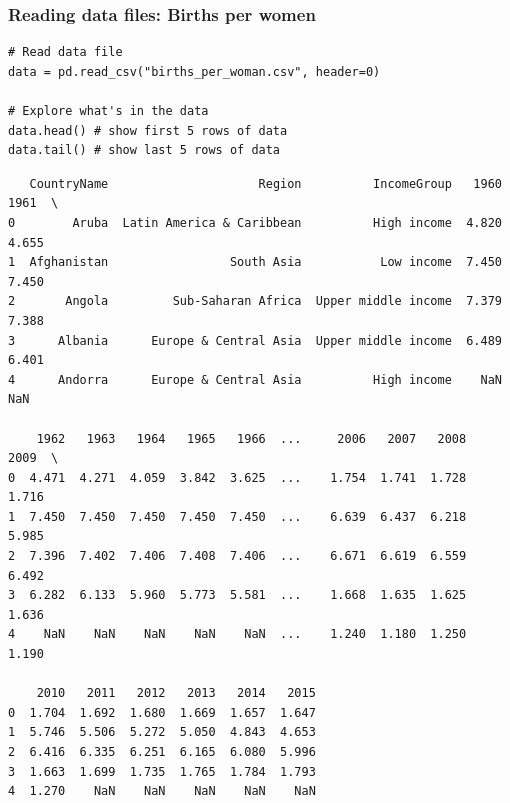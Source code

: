 \documentclass[xcolor=table]{beamer}
\begin{document}
\begin{frame}[fragile]
\frametitle{Reading data files: Births per women}

\begin{lstlisting}[style=python]
# Read data file
data = pd.read_csv("births_per_woman.csv", header=0)

# Explore what's in the data 
data.head() # show first 5 rows of data
data.tail() # show last 5 rows of data
\end{lstlisting}

\vspace{-0.8cm}
{\fontsize{5}{6}\selectfont
\begin{verbatim}
   CountryName                     Region          IncomeGroup   1960   1961  \
0        Aruba  Latin America & Caribbean          High income  4.820  4.655   
1  Afghanistan                 South Asia           Low income  7.450  7.450   
2       Angola         Sub-Saharan Africa  Upper middle income  7.379  7.388   
3      Albania      Europe & Central Asia  Upper middle income  6.489  6.401   
4      Andorra      Europe & Central Asia          High income    NaN    NaN   

    1962   1963   1964   1965   1966  ...     2006   2007   2008   2009  \
0  4.471  4.271  4.059  3.842  3.625  ...    1.754  1.741  1.728  1.716   
1  7.450  7.450  7.450  7.450  7.450  ...    6.639  6.437  6.218  5.985   
2  7.396  7.402  7.406  7.408  7.406  ...    6.671  6.619  6.559  6.492   
3  6.282  6.133  5.960  5.773  5.581  ...    1.668  1.635  1.625  1.636   
4    NaN    NaN    NaN    NaN    NaN  ...    1.240  1.180  1.250  1.190   

    2010   2011   2012   2013   2014   2015  
0  1.704  1.692  1.680  1.669  1.657  1.647  
1  5.746  5.506  5.272  5.050  4.843  4.653  
2  6.416  6.335  6.251  6.165  6.080  5.996  
3  1.663  1.699  1.735  1.765  1.784  1.793  
4  1.270    NaN    NaN    NaN    NaN    NaN 
\end{verbatim}}

\end{frame}
\end{document}

